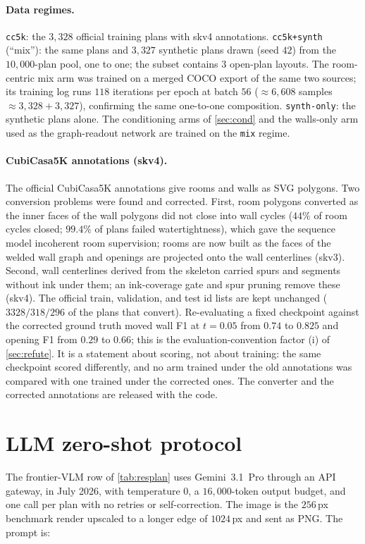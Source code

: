 \documentclass{article}
\begin{document}
\paragraph{Data regimes.} \texttt{cc5k}: the $3{,}328$ official training
plans with skv4 annotations. \texttt{cc5k+synth} (``mix''): the same plans
and $3{,}327$ synthetic plans drawn (seed $42$) from the $10{,}000$-plan
pool, one to one; the subset contains $3$ open-plan layouts. The
room-centric mix arm was trained on a merged COCO export of the same two
sources; its training log runs $118$ iterations per epoch at batch $56$
($\approx6{,}608$ samples $\approx3{,}328+3{,}327$), confirming the same
one-to-one composition.
\texttt{synth-only}: the synthetic plans alone. The conditioning arms of
\cref{sec:cond} and the walls-only arm used as the graph-readout network are
trained on the \texttt{mix} regime.

\paragraph{CubiCasa5K annotations (skv4).} The official CubiCasa5K
annotations give rooms and walls as SVG polygons. Two conversion problems
were found and corrected. First, room polygons converted as the inner faces
of the wall polygons did not close into wall cycles ($44\%$ of room cycles
closed; $99.4\%$ of plans failed watertightness), which gave the sequence
model incoherent room supervision; rooms are now built as the faces of the
welded wall graph and openings are projected onto the wall centerlines
(skv3). Second, wall centerlines derived from the skeleton carried spurs and
segments without ink under them; an ink-coverage gate and spur pruning
remove these (skv4). The official train, validation, and test id lists are
kept unchanged ($3328/318/296$ of the plans that convert). Re-evaluating a
fixed checkpoint against the corrected ground truth moved wall F1 at $t=0.05$
from $0.74$ to $0.825$ and opening F1 from $0.29$ to $0.66$; this is the
evaluation-convention factor (i) of \cref{sec:refute}. It is a statement
about scoring, not about training: the same checkpoint scored differently,
and no arm trained under the old annotations was compared with one trained
under the corrected ones. The converter and the corrected
annotations are released with the code.

\section{LLM zero-shot protocol}\label{app:vlm}
The frontier-VLM row of \cref{tab:resplan} uses Gemini~3.1~Pro through an
API gateway, in July 2026, with temperature $0$, a $16{,}000$-token output
budget, and one call per plan with no retries or self-correction. The image
is the $256$\,px benchmark render upscaled to a longer edge of $1024$\,px
and sent as PNG. The prompt is:
\end{document}
